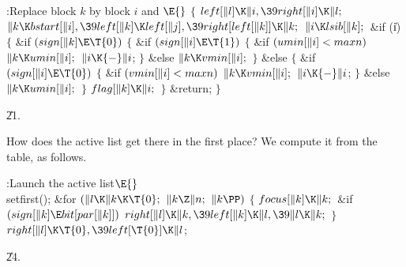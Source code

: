 \B{}:Replace block $k$ by block $i$ and %
\X${}\E{}$\6
${}\{{}$\1\6
${}\\{left}[\|l]\K\|i,\39\\{right}[\|i]\K\|l;{}$\6
${}\|k\K\\{bstart}[\|i],\39\\{left}[\|k]\K\\{left}[\|j],\39\\{right}[\\{left}[%
\|k]]\K\|k;{}$\6
${}\|i\K\\{lsib}[\|k];{}$\6
\&{if} (\|i)\5
${}\{{}$\1\6
\&{if} ${}(\\{sign}[\|k]\E\T{0}){}$\5
${}\{{}$\1\6
\&{if} ${}(\\{sign}[\|i]\E\T{1}){}$\5
${}\{{}$\1\6
\&{if} ${}(\\{umin}[\|i]<\\{maxn}){}$\1\5
${}\|k\K\\{umin}[\|i];{}$\2\6
${}\|i\K{-}\|i{}$;\6
\4${}\}{}$\5
\2\&{else}\1\5
${}\|k\K\\{vmin}[\|i];{}$\2\6
\4${}\}{}$\5
\2\&{else}\5
${}\{{}$\1\6
\&{if} ${}(\\{sign}[\|i]\E\T{0}){}$\5
${}\{{}$\1\6
\&{if} ${}(\\{vmin}[\|i]<\\{maxn}){}$\1\5
${}\|k\K\\{vmin}[\|i];{}$\2\6
${}\|i\K{-}\|i{}$;\6
\4${}\}{}$\5
\2\&{else}\1\5
${}\|k\K\\{umin}[\|i];{}$\2\6
\4${}\}{}$\2\6
${}\\{flag}[\|k]\K\|i;{}$\6
\4${}\}{}$\2\6
\&{return};\6
\4${}\}{}$\2\par
\U21.\fi

How does the active list get there in the first place? We
compute it from the  table, as follows.

\Y\B\4:Launch the active list\X${}\E{}$\6
\\{setfirst}();\6
\&{for} ${}(\|l\K\|k\K\T{0};{}$ ${}\|k\Z\|n;{}$ ${}\|k\PP){}$\5
${}\{{}$\1\6
${}\\{focus}[\|k]\K\|k;{}$\6
\&{if} ${}(\\{sign}[\|k]\E\\{bit}[\\{par}[\|k]]){}$\1\5
${}\\{right}[\|l]\K\|k,\39\\{left}[\|k]\K\|l,\39\|l\K\|k;{}$\2\6
\4${}\}{}$\2\6
${}\\{right}[\|l]\K\T{0},\39\\{left}[\T{0}]\K\|l{}$;\par
\U24.\fi

